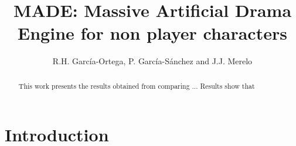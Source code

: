 \documentclass[runningheads]{llncs}
\begin{document}
\mainmatter  %



\title{MADE: Massive Artificial Drama Engine for non player characters}

\author{R.H. Garc\'ia-Ortega, P. Garc\'ia-S\'anchez and J.J. Merelo}

%








\maketitle


\begin{abstract}

This work presents the results obtained from comparing ... Results show that 
\end{abstract}





\section{Introduction}
\noindent 
\end{document}
